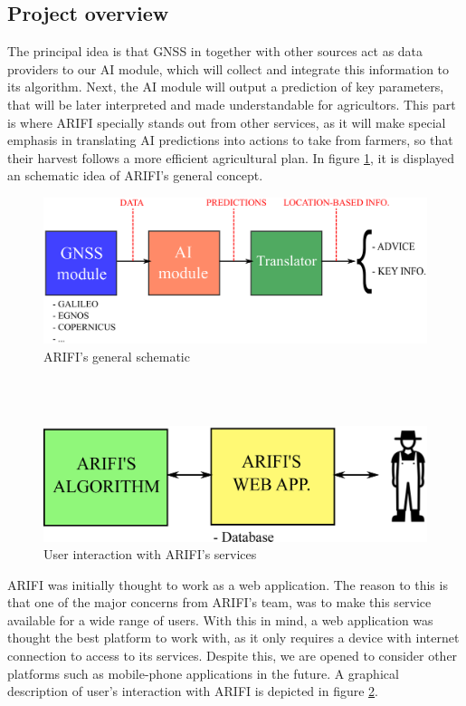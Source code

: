 \subsection{Project overview}
The principal idea is that GNSS in together with other sources act as data providers to our AI module, which will collect and integrate this information to its algorithm. Next, the AI module will output a prediction of key parameters, that will be later interpreted and made understandable for agricultors. This part is where ARIFI specially stands out from other services, as it will make special emphasis in translating AI predictions into actions to take from farmers, so that their harvest follows a more efficient agricultural plan. In figure \ref{fig:sch1}, it is displayed an schematic idea of ARIFI's general concept.
\begin{figure}[h!]
    \centering
    \includegraphics[scale= 0.26]{images/dibujo1.eps}
    \caption{ARIFI's general schematic}
    \label{fig:sch1}
\end{figure}\\\\
%
%
\begin{figure}[h!]
    \centering
    \includegraphics[scale= 0.20]{images/dibujo2.eps}
    \caption{User interaction with ARIFI's services}
    \label{fig:sch2}
\end{figure}
ARIFI was initially thought to work as a web application. The reason to this is that one of the major concerns from ARIFI's team, was to make this service available for a wide range of users. With this in mind, a web application was thought the best platform to work with, as it only requires a device with internet connection to access to its services. Despite this, we are opened to consider other platforms such as mobile-phone applications in the future. A graphical description of user's interaction with ARIFI is depicted in figure \ref{fig:sch2}.
